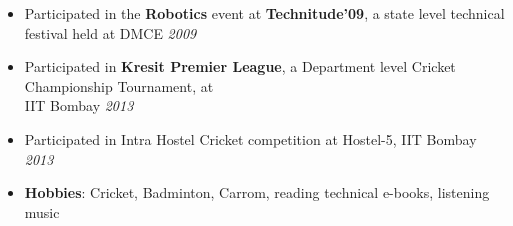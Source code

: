 \begin{itemize}
	\item Participated in the \textbf{Robotics} event at \textbf{Technitude'09}, a state level technical festival held at DMCE \hfill \emph{2009} \\[-0.6cm]
	\item Participated in \textbf{Kresit Premier League}, a Department level Cricket Championship Tournament, at \\ IIT Bombay \hfill \emph{2013} \\[-0.6cm]
	\item Participated in Intra Hostel Cricket competition at Hostel-5, IIT Bombay \hfill \emph{2013} \\[-0.6cm]
	\item \textbf{Hobbies}: Cricket, Badminton, Carrom, reading technical e-books, listening music \hfill \\[-0.6cm]
\end{itemize}
